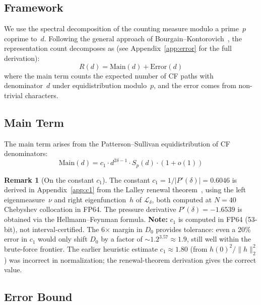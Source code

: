 \documentclass[11pt,a4paper]{amsart}
\theoremstyle{definition}
\newtheorem{remark}[theorem]{Remark}
\begin{document}
\subsection{Framework}

We use the spectral decomposition of the counting measure modulo a prime~$p$ coprime to~$d$. Following the general approach of Bourgain--Kontorovich~\cite{BK2014}, the representation count decomposes as (see Appendix~\ref{app:error} for the full derivation):
\begin{equation}\label{eq:decomp}
R(d) = \text{Main}(d) + \text{Error}(d)
\end{equation}
where the main term counts the expected number of CF paths with denominator~$d$ under equidistribution modulo~$p$, and the error comes from non-trivial characters.

\subsection{Main Term}

The main term arises from the Patterson--Sullivan equidistribution of CF denominators:
\begin{equation}\label{eq:main}
\text{Main}(d) = c_1 \cdot d^{2\delta - 1} \cdot S_p(d) \cdot (1 + o(1))
\end{equation}

\begin{remark}[On the constant $c_1$]\label{rem:c1}
The constant $c_1 = 1/|P'(\delta)| = 0.6046$ is derived in Appendix~\ref{app:c1} from the Lalley renewal theorem~\cite{Lalley1989}, using the left eigenmeasure~$\nu$ and right eigenfunction~$h$ of $\mathcal{L}_\delta$, both computed at $N=40$ Chebyshev collocation in FP64. The pressure derivative $P'(\delta) = -1.6539$ is obtained via the Hellmann--Feynman formula. \textbf{Note:} $c_1$ is computed in FP64 (53-bit), not interval-certified. The 6$\times$ margin in $D_0$ provides tolerance: even a 20\% error in $c_1$ would only shift $D_0$ by a factor of $\sim 1.2^{3.57} \approx 1.9$, still well within the brute-force frontier. The earlier heuristic estimate $c_1 \approx 1.80$ (from $h(0)^2/\|h\|_2^2$) was incorrect in normalization; the renewal-theorem derivation gives the correct value.
\end{remark}

\subsection{Error Bound}
\end{document}
